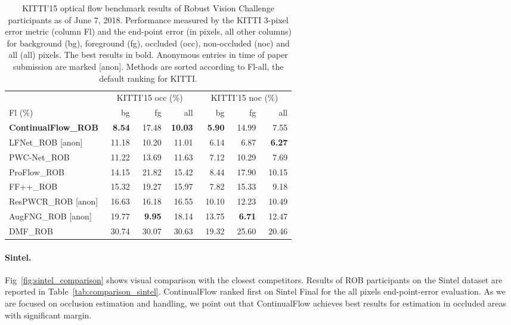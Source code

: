 \documentclass[runningheads]{llncs}
\begin{document}
\begin{table}[]
\caption{KITTI'15 optical flow benchmark results of Robust Vision Challenge participants as of June 7, 2018.
Performance measured by the KITTI 3-pixel error metric (column Fl) and the end-point error (in pixels, all other columns) for background (bg), foreground (fg), occluded (occ), non-occluded (noc) and all (all) pixels.
The best results in bold.
Anonymous entries in time of paper submission are marked {[}anon{]}.
Methods are sorted according to Fl-all, the default ranking for KITTI.}
\label{tab:comparison_kitti}
\centering
\begin{adjustbox}{max width=\textwidth}
\begin{tabular}{l|rrr|rrr}
 & \multicolumn{3}{c|}{KITTI'15 occ (\%)} & \multicolumn{3}{c}{KITTI'15 noc (\%)} \\
Fl (\%) & bg & fg & all & bg & fg & all \\ \hline
\textbf{ContinualFlow\_ROB} & \textbf{8.54} & 17.48 & \textbf{10.03} & \textbf{5.90} & 14.99 & 7.55 \\ 
LFNet\_ROB {[}anon{]} & 11.18 & 10.20 & 11.01 & 6.14 & 6.87 & \textbf{6.27} \\
PWC-Net\_ROB~\cite{Sun2017} & 11.22 & 13.69 & 11.63 & 7.12 & 10.29 & 7.69 \\
ProFlow\_ROB~\cite{Maurer2018} & 14.15 & 21.82 & 15.42 & 8.44 & 17.90 & 10.15 \\
FF++\_ROB~\cite{Schuster2018a} & 15.32 & 19.27 & 15.97 & 7.82 & 15.33 & 9.18 \\
ResPWCR\_ROB {[}anon{]} & 16.63 & 16.18 & 16.55 & 10.10 & 12.23 & 10.49 \\
AugFNG\_ROB {[}anon{]} & 19.77 & \textbf{9.95} & 18.14 & 13.75 & \textbf{6.71} & 12.47 \\
DMF\_ROB~\cite{Weinzaepfel2013} & ~30.74 & ~30.07 & ~30.63 & ~19.32 & ~25.60 & ~20.46 \\
\end{tabular}
\end{adjustbox}
\end{table}


\paragraph{\bf\textbf{Sintel.}}
Fig~\ref{fig:sintel_comparison} shows visual comparison with the closest competitors. Results of ROB participants  on the Sintel dataset are reported in Table~\ref{tab:comparison_sintel}. ContinualFlow ranked first on Sintel Final for the all pixels end-point-error evaluation. As we are focused on occlusion estimation and handling, we point out that ContinualFlow achieves best results for estimation in occluded areas with significant margin.
\end{document}

